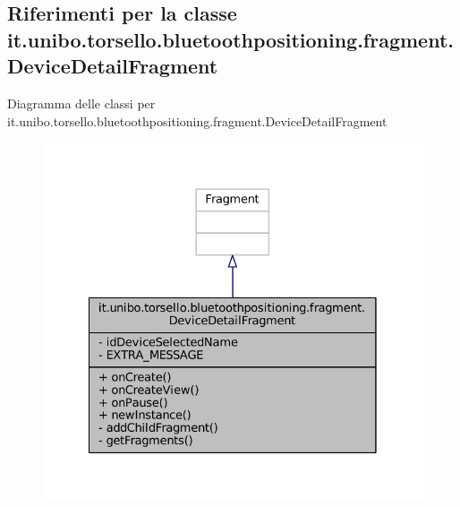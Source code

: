 \hypertarget{classit_1_1unibo_1_1torsello_1_1bluetoothpositioning_1_1fragment_1_1DeviceDetailFragment}{}\subsection{Riferimenti per la classe it.\+unibo.\+torsello.\+bluetoothpositioning.\+fragment.\+Device\+Detail\+Fragment}
\label{classit_1_1unibo_1_1torsello_1_1bluetoothpositioning_1_1fragment_1_1DeviceDetailFragment}


Diagramma delle classi per it.\+unibo.\+torsello.\+bluetoothpositioning.\+fragment.\+Device\+Detail\+Fragment
\nopagebreak
\begin{figure}[H]
\begin{center}
\leavevmode
\includegraphics[width=328pt]{classit_1_1unibo_1_1torsello_1_1bluetoothpositioning_1_1fragment_1_1DeviceDetailFragment__inherit__graph}
\end{center}
\end{figure}


